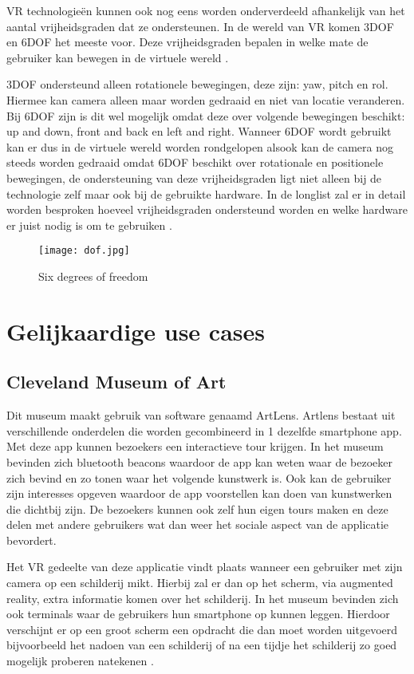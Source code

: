 VR technologieën kunnen ook nog eens worden onderverdeeld afhankelijk van het aantal vrijheidsgraden dat ze ondersteunen. In de wereld van VR komen 3DOF en 6DOF het meeste voor. Deze vrijheidsgraden bepalen in welke mate de gebruiker kan bewegen in de virtuele wereld \autocite{Shenchang1995}.

3DOF ondersteund alleen rotationele bewegingen, deze zijn: yaw, pitch en rol. Hiermee kan camera alleen maar worden gedraaid en niet van locatie veranderen. Bij 6DOF zijn is dit wel mogelijk omdat deze over volgende bewegingen beschikt: up and down, front and back en left and right. 
Wanneer 6DOF wordt gebruikt kan er dus in de virtuele wereld worden rondgelopen alsook kan de camera nog steeds worden gedraaid omdat 6DOF beschikt over rotationale en positionele bewegingen, de ondersteuning van deze vrijheidsgraden ligt niet alleen bij de technologie zelf maar ook bij de gebruikte hardware. In de longlist zal er in detail worden besproken hoeveel vrijheidsgraden ondersteund worden en welke hardware er juist nodig is om te gebruiken \autocite{Shenchang1995}.

\begin{figure}
    \texttt{[image: dof.jpg]}
    \caption{Six degrees of freedom}
    \label{fig:dof}
\end{figure}

\section{Gelijkaardige use cases}
\subsection{Cleveland Museum of Art}
Dit museum maakt gebruik van software genaamd ArtLens. Artlens bestaat uit verschillende onderdelen die worden gecombineerd in 1 dezelfde smartphone app. Met deze app kunnen bezoekers een interactieve tour krijgen. In het museum bevinden zich bluetooth beacons waardoor de app kan weten waar de bezoeker zich bevind en zo tonen waar het volgende kunstwerk is. Ook kan de gebruiker zijn interesses opgeven waardoor de app voorstellen kan doen van kunstwerken die dichtbij zijn. 
De bezoekers kunnen ook zelf hun eigen tours maken en deze delen met andere gebruikers wat dan weer het sociale aspect van de applicatie bevordert.

Het VR gedeelte van deze applicatie vindt plaats wanneer een gebruiker met zijn camera op een schilderij mikt. Hierbij zal er dan op het scherm, via augmented reality, extra informatie komen over het schilderij.
In het museum bevinden zich ook terminals waar de gebruikers hun smartphone op kunnen leggen. Hierdoor verschijnt er op een groot scherm een opdracht die dan moet worden uitgevoerd bijvoorbeeld het nadoen van een schilderij of na een tijdje het schilderij zo goed mogelijk proberen natekenen \autocite{Ding2017}.

